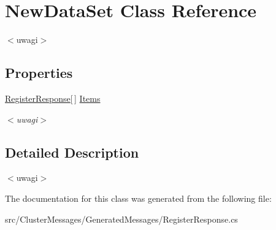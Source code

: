 \hypertarget{class_new_data_set}{}\section{New\+Data\+Set Class Reference}
\label{class_new_data_set}


$<$uwagi$>$  


\subsection*{Properties}
\begin{DoxyCompactItemize}
\item 
\hypertarget{class_new_data_set_aa80f43947c987fac06d3d836eee79c1b}{}\hyperlink{class_register_response}{Register\+Response}\mbox{[}$\,$\mbox{]} \hyperlink{class_new_data_set_aa80f43947c987fac06d3d836eee79c1b}{Items}\label{class_new_data_set_aa80f43947c987fac06d3d836eee79c1b}

\begin{DoxyCompactList}\small\item\em $<$uwagi$>$ \end{DoxyCompactList}\end{DoxyCompactItemize}


\subsection{Detailed Description}
$<$uwagi$>$ 

The documentation for this class was generated from the following file\+:\begin{DoxyCompactItemize}
\item 
src/\+Cluster\+Messages/\+Generated\+Messages/Register\+Response.\+cs\end{DoxyCompactItemize}
